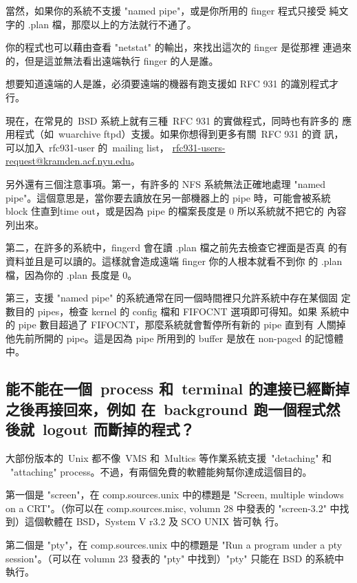 \documentclass{article}
\begin{document}
\begin{CJK*}{Bg5}{ming}
	當然，如果你的系統不支援 "named pipe"，或是你所用的 finger 程式只接受
        純文字的 .plan 檔，那麼以上的方法就行不通了。

	你的程式也可以藉由查看 "netstat" 的輸出，來找出這次的 finger 是從那裡
        連過來的，但是這並無法看出遠端執行 finger 的人是誰。

	想要知道遠端的人是誰，必須要遠端的機器有跑支援如 RFC 931 的識別程式才
	行。

	現在，在常見的~BSD 系統上就有三種~RFC 931 的實做程式，同時也有許多的
	應用程式（如~wuarchive ftpd）支援。如果你想得到更多有關~RFC 931 的資
        訊，可以加入~rfc931-user 的~mailing list，
        \url{rfc931-users-request@kramden.acf.nyu.edu}。

	另外還有三個注意事項。第一，有許多的 NFS 系統無法正確地處理 "named 
	pipe"。這個意思是，當你要去讀放在另一部機器上的 pipe 時，可能會被系統 
	block 住直到time out，或是因為 pipe 的檔案長度是 0 所以系統就不把它的
        內容列出來。

	第二，在許多的系統中，fingerd 會在讀 .plan 檔之前先去檢查它裡面是否真
        的有資料並且是可以讀的。這樣就會造成遠端 finger 你的人根本就看不到你
        的 .plan 檔，因為你的 .plan 長度是 0。

	第三，支援 "named pipe" 的系統通常在同一個時間裡只允許系統中存在某個固
	定數目的 pipes，檢查 kernel 的 config 檔和 FIFOCNT 選項即可得知。如果
        系統中的 pipe 數目超過了 FIFOCNT，那麼系統就會暫停所有新的 pipe 直到有
        人關掉他先前所開的 pipe。這是因為 pipe 所用到的 buffer 是放在 
        non-paged 的記憶體中。

\subsection{能不能在一個~process 和~terminal 的連接已經斷掉之後再接回來，例如
       在~background 跑一個程式然後就~logout 而斷掉的程式？}

	大部份版本的~Unix 都不像~VMS 和~Multics 等作業系統支援~"detaching" 和 
	~"attaching" process。不過，有兩個免費的軟體能夠幫你達成這個目的。

	第一個是 "screen"，在 comp.sources.unix 中的標題是 "Screen, multiple 
        windows on a CRT"。（你可以在 comp.sources.misc, volumn 28 中發表的 
        "screen-3.2" 中找到）這個軟體在 BSD，System V r3.2 及 SCO UNIX 皆可執
        行。

	第二個是 "pty"，在 comp.sources.unix 中的標題是 "Run a program under 
        a pty session"。（可以在 volumn 23 發表的 "pty" 中找到）"pty" 只能在 
        BSD 的系統中執行。


\end{CJK*}
\end{document}
